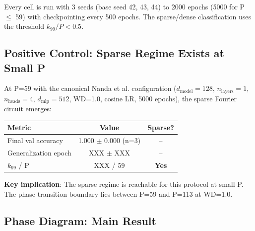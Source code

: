 Every cell is run with 3 seeds (base seed 42, 43, 44) to 2000 epochs (5000 for P $\le$ 59)
with checkpointing every 500 epochs. The sparse/dense classification uses the
threshold $k_{99}/P < 0.5$.

\subsection{Positive Control: Sparse Regime Exists at Small P}

At P=59 with the canonical Nanda et al. configuration ($d_{\text{model}}=128$,
$n_{\text{layers}}=1$, $n_{\text{heads}}=4$, $d_{\text{mlp}}=512$, WD=1.0, cosine LR,
5000 epochs), the sparse Fourier circuit emerges:

\begin{center}
\begin{tabular}{lcc}
\toprule
Metric & Value & Sparse? \\
\midrule
Final val accuracy & 1.000 $\pm$ 0.000 (n=3) & -- \\
Generalization epoch & XXX $\pm$ XXX & -- \\
$k_{99}$ / P & XXX / 59 & \textbf{Yes} \\
\bottomrule
\end{tabular}
\end{center}

\textbf{Key implication}: The sparse regime is reachable for this protocol at small
P. The phase transition boundary lies between P=59 and P=113 at WD=1.0.

\subsection{Phase Diagram: Main Result}

